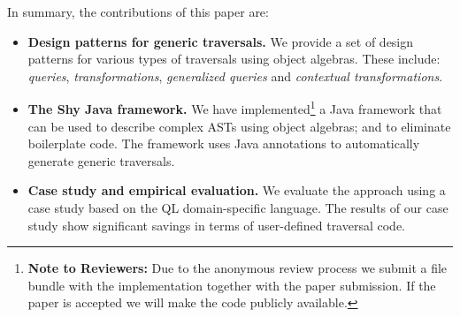 In summary, the contributions of this paper are:

\begin{itemize}

\item {\bf Design patterns for generic traversals.} We provide a set of design
patterns for various types of traversals using object algebras. These include:
\emph{queries}, \emph{transformations},
\emph{generalized queries} and \emph{contextual transformations}.

\item {\bf The Shy Java framework.} We have implemented\footnote{{\bf
      Note to Reviewers:} Due to the anonymous review process we
    submit a file bundle with the implementation together with the paper submission. If the
    paper is accepted we will make the code publicly available.} a
  Java framework that can be used to describe complex ASTs using
  object algebras; and to eliminate boilerplate code. The framework
  uses Java annotations to automatically generate generic traversals.


\item {\bf Case study and empirical evaluation.} We evaluate the
  approach using a case study based on the QL domain-specific
  language. The results of our case study show significant savings in
  terms of user-defined traversal code.
\end{itemize}

